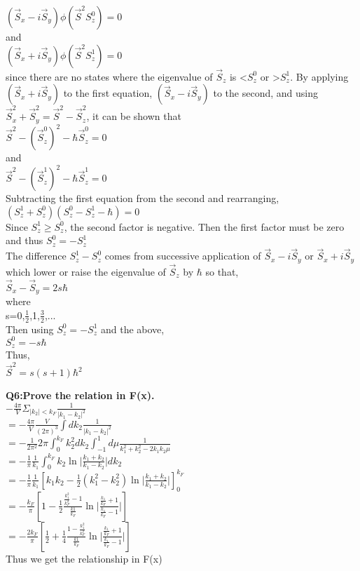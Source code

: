 \documentclass{article}
\begin{document}
\noindent $(\vec{S}_x-i\vec{S}_y)\phi(\vec{S}^2 S^{0}_z)=0$\\
\noindent and\\
\noindent $(\vec{S}_x+i\vec{S}_y)\phi(\vec{S}^2 S^{1}_z)=0$\\
\noindent since there are no states where the eigenvalue of $\vec{S}_z$ is \textless $S^0_z$ or \textgreater $S^1_z$. By applying \\
\noindent $(\vec{S}_x+i\vec{S}_y)$ to the first equation, $(\vec{S}_x-i\vec{S}_y)$ to the second, and using $\vec{S}^2_x+\vec{S}^2_y=\vec{S}^2-\vec{S}^2_z$, it can be shown that\\
\noindent $\vec{S}^2-(\vec{S}^0_z)^2-\hbar\vec{S}^0_z=0$\\
\noindent and\\
\noindent $\vec{S}^2-(\vec{S}^1_z)^2-\hbar\vec{S}^1_z=0$\\
\noindent Subtracting the first equation from the second and rearranging,\\
\noindent $(S^1_z+S^0_z)(S^0_z-S^1_z-\hbar)=0$\\
\noindent Since $S^1_z\geq S^0_z$, the second factor is negative. Then the first factor must be zero and thus $S^0_z=-S^1_z$\\
\noindent The difference $S^1_z-S^0_z$ comes from successive application of $\vec{S}_x-i\vec{S}_y$ or $\vec{S}_x+i\vec{S}_y$ which lower or raise the eigenvalue of $\vec{S}_z$ by $\hbar$ so that,\\
\noindent $\vec{S}_x-\vec{S}_y=2s\hbar$\\
\noindent where\\
\noindent s=0,$\frac{1}{2}$,1,$\frac{3}{2}$,...\\
\noindent Then using $S^0_z=-S^1_z$ and the above,\\
\noindent $S^0_z=-s\hbar$\\
\noindent Thus,\\
\noindent $\vec{S}^2=s(s+1)\hbar^2$


\newpage
\noindent \textbf{Q6:Prove the relation in F(x).}\\
\noindent $-\frac{4\pi}{V}\Sigma_{\lvert{k_2}\rvert<k_F}\frac{1}{\lvert{k_1-k_2}\rvert^2}$\\
\noindent $=-\frac{4\pi}{V}\frac{V}{(2\pi)^3}\int{dk_2}\frac{1}{\lvert{k_1-k_2}\rvert^2}$\\
\noindent $=-\frac{1}{2\pi^2}2\pi\int^{k_F}_{0}k^2_2dk_2\int^1_{-1}d\mu\frac{1}{k^2_1+k^2_2-2k_1k_2\mu}$\\
\noindent $=-\frac{1}{\pi}\frac{1}{k_1}\int^{k_F}_{0}k_2\ln\lvert\frac{k_1+k_2}{k_1-k_2}\rvert dk_2$\\
\noindent $=-\frac{1}{\pi}\frac{1}{k_1}[k_1k_2-\frac{1}{2}(k_1^2-k_2^2)\ln\lvert\frac{k_1+k_2}{k_1-k_2}\rvert]^{k_F}_{0}$\\
\noindent $=-\frac{k_F}{\pi}[1-\frac{1}{2}\frac{\frac{k^2_1}{k^2_F}-1}{\frac{k1}{k_F}}\ln\lvert\frac{\frac{k_1}{k_F}+1}{\frac{k_1}{k_F}-1}\rvert]$\\
\noindent $=-\frac{2k_F}{\pi}[\frac{1}{2}+\frac{1}{4}\frac{1-\frac{k^2_1}{k^2_F}}{\frac{k1}{k_F}}\ln\lvert\frac{\frac{k_1}{k_F}+1}{\frac{k_1}{k_F}-1}\rvert]$\\
\noindent Thus we get the relationship in F(x)
\end{document}
